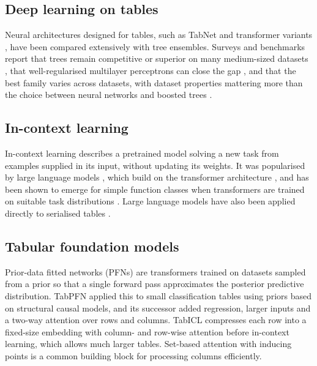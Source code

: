 \documentclass{ieeeaccess}
\begin{document}
\subsection{Deep learning on tables}
Neural architectures designed for tables, such as TabNet \cite{arik2021tabnet} and transformer variants \cite{gorishniy2021revisiting}, have been compared extensively with tree ensembles. Surveys and benchmarks report that trees remain competitive or superior on many medium-sized datasets \cite{shwartzziv2022tabular,borisov2024survey,grinsztajn2022tree}, that well-regularised multilayer perceptrons can close the gap \cite{kadra2021welltuned}, and that the best family varies across datasets, with dataset properties mattering more than the choice between neural networks and boosted trees \cite{mcelfresh2023neural}.

\subsection{In-context learning}
In-context learning describes a pretrained model solving a new task from examples supplied in its input, without updating its weights. It was popularised by large language models \cite{brown2020gpt3}, which build on the transformer architecture \cite{vaswani2017attention}, and has been shown to emerge for simple function classes when transformers are trained on suitable task distributions \cite{garg2022icl}. Large language models have also been applied directly to serialised tables \cite{hegselmann2023tabllm}.

\subsection{Tabular foundation models}
Prior-data fitted networks (PFNs) \cite{muller2022pfn} are transformers trained on datasets sampled from a prior so that a single forward pass approximates the posterior predictive distribution. TabPFN \cite{hollmann2023tabpfn} applied this to small classification tables using priors based on structural causal models, and its successor \cite{hollmann2025tabpfn} added regression, larger inputs and a two-way attention over rows and columns. TabICL \cite{qu2025tabicl} compresses each row into a fixed-size embedding with column- and row-wise attention before in-context learning, which allows much larger tables. Set-based attention with inducing points \cite{lee2019set} is a common building block for processing columns efficiently.
\end{document}
